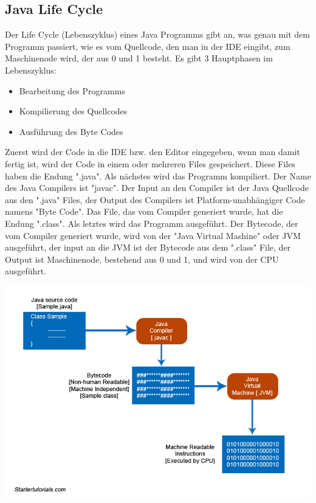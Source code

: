 \subsection{Java Life Cycle}

Der Life Cycle (Lebenszyklus) eines Java Programms gibt an, was genau mit dem Programm passiert, wie es vom Quellcode, den man in der IDE eingibt, zum Maschinenode wird, der aus 0 und 1 besteht.
Es gibt 3 Hauptphasen im Lebenszyklus:
\begin{itemize}
    \item Bearbeitung des Programms
    \item Kompilierung des Quellcodes
    \item Ausführung des Byte Codes
\end{itemize}
Zuerst wird der Code in die IDE bzw. den Editor eingegeben, wenn man damit fertig ist, wird der Code in einem oder mehreren Files gespeichert. Diese Files haben die Endung ".java". 
Als nächstes wird das Programm kompiliert. Der Name des Java Compilers ist "javac". Der Input an den Compiler ist der Java Quellcode aus den ".java" Files, der Output des Compilers 
ist Platform-unabhängiger Code namens "Byte Code". Das File, das vom Compiler generiert wurde, hat die Endung ".class". Als letztes wird das Programm ausgeführt. Der Bytecode, der vom Compiler 
generiert wurde, wird von der "Java Virtual Mashine" oder JVM ausgeführt, der input an die JVM ist der Bytecode aus dem ".class" File, der Output ist Maschinenode, bestehend aus 0 und 1, und wird von der CPU ausgeführt.
\cite{sysarch-java-2}
\begin{spacing}{1}
\includegraphics[scale=0.6]{pics/java-life-cycle.jpg}
\end{spacing}



